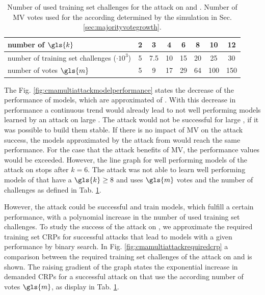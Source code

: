 \begin{table}[ht]
\centering
\begin{tabular}{|l|c|c|c|c|c|c|c|}
\hline
number of $\gls{k}$ & 2 & 3 & 4 & 6 & 8 & 10 & 12\\
\hline
number of training set challenges ($\cdot 10^3$) & 5 & 7.5 & 10 & 15 & 20 & 25 & 30\\
\hline
number of votes $\gls{m}$ & 5 & 9 & 17 & 29 & 64 & 100 & 150\\
\hline
\end{tabular}
\caption[Number of votes and challenges used for \acs{CMA-ES} attack]{Number of used training set challenges for the attack on \xpufs and \mxpufs. Number of \ac{MV} votes used for the according \mxpufs determined by the simulation in Sec. \ref{sec:majorityvotegrowth}.}
\label{tab:cmamultinumbervotes}
\end{table}

The Fig. \ref{fig:cmamultiattackmodelperformance} states the decrease of the performance of models, which are approximated of \xpufs.
With this decrease in performance a continuous trend would already lead to not well performing models learned by an attack on large \xpufs.
The attack would not be successful for large \xpufs, if it was possible to build them stable.
If there is no impact of \ac{MV} on the attack success, the models approximated by the attack from \mxpufs would reach the same performance.
For the case that the attack benefits of \ac{MV}, the performance values would be exceeded.
However, the line graph for well performing models of the attack on \mxpufs stops after $k = 6$.
The attack was not able to learn well performing models of \mxpufs that have a $\gls{k} \ge 8$ and uses $\gls{m}$ votes and the number of challenges as defined in Tab. \ref{tab:cmamultinumbervotes}.

However, the attack could be successful and train models, which fulfill a certain performance, with a polynomial increase in the number of used training set challenges.
To study the success of the attack on \mxpufs, we approximate the required training set \acp{CRP} for successful attacks that lead to models with a given performance by binary search.
In Fig. \ref{fig:cmamultiattackrequiredcrp} a comparison between the required training set challenges of the attack on \xpufs and \mxpufs is shown.
The raising gradient of the graph states the exponential increase in demanded \acp{CRP} for a successful attack on \mxpufs that use the according number of votes $\gls{m}$, as display in Tab. \ref{tab:cmamultinumbervotes}.

